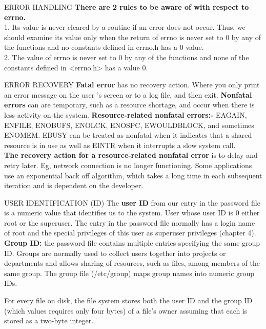 \documentclass{beamer}
\begin{document}
\begin{frame}[t]{ERROR HANDLING}
\textbf{There are 2 rules to be aware of with respect to errno.} 
\\[6pt]1. Its value is never cleared by a routine if an error does not occur. Thus, we should examine its value only when the return of errno is never set to 0 by any of the functions and no constants defined in errno.h has a 0 value.
\\[6pt]2. The value of errno is never set to 0 by any of the functions and none of the constants defined in <errno.h> has a value 0. 

\end{frame}


\begin{frame}[t]{ERROR RECOVERY}
\textbf{Fatal error} has no recovery action. Where you only print an error message on the user ’s screen or to a log file, and then exit.
\textbf{Nonfatal errors} can are temporary, such as a resource shortage, and occur when there is less activity on the system. \textbf{Resource-related nonfatal errors:-} EAGAIN, ENFILE, ENOBUFS, ENOLCK, ENOSPC, EWOULDBLOCK, and sometimes ENOMEM. EBUSY can be treated as nonfatal when it indicates that a shared resource is in use as well as EINTR when it interrupts a slow system call.\\[6pt]
\textbf{The recovery action for a resource-related nonfatal error} is to delay and retry later. Eg, network connection is no longer functioning.
Some applications use an exponential back off algorithm, which takes a long time in each subsequent iteration and is dependent on the developer.


\end{frame}
\begin{frame}[t]{USER IDENTIFICATION (ID)}
The \textbf{user ID} from our entry in the password file is a numeric value that identifies us to the system. 
User whose user ID is 0 either root or the superuser. The entry in the
password file normally has a login name of root and the special privileges of this user as superuser privileges (chapter 4).\\[6pt]
\textbf{Group ID:} the password file contains multiple entries specifying the same group ID. Groups are normally used to collect users together into projects or departments and allows sharing of resources, such as files, among members of the same group. 
The group file (/etc/group) maps group names into numeric group IDs. 

For every file on disk, the file system stores both the user ID and the group ID (which values requires only four bytes) of a file’s owner assuming that each is stored as a two-byte integer.

\end{frame}
\end{document}
